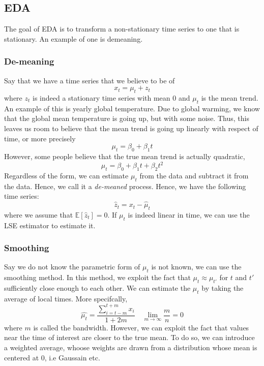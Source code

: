 \documentclass[12pt]{article}
\newcommand{\E}{\mathbb{E}}
\begin{document}
\subsection{EDA}
The goal of EDA is to transform a non-stationary time series to one that is stationary. An example of one is demeaning. 
\subsubsection{De-meaning}
Say that we have a time series that we believe to be of 
\[
	x_t = \mu_t + z_t 
\]
where $z_t$ is indeed a stationary time series with mean 0 and $\mu_t$ is the mean trend. An example of this is yearly global temperature. Due to global warming, we know that the global mean temperature is going up, but with some noise. Thus, this leaves us room to believe that the mean trend is going up linearly with respect of time, or more precisely 
\[
	\mu_t = \beta_0 + \beta_1t 
\]
However, some people believe that the true mean trend is actually quadratic, 
\[
	\mu_t = \beta_0 + \beta_1 t + \beta_2 t^2 
\]
Regardless of the form, we can estimate $\mu_t$ from the data and subtract it from the data. Hence, we call it a \emph{de-meaned} process. Hence, we have the following time series:
\[
	\hat{z}_t = x_t - \hat{\mu}_t 
\]
where we assume that $\E[\hat{z}_t] = 0$. If $\mu_t$ is indeed linear in time, we can use the LSE estimator to estimate it. 
\subsubsection{Smoothing}
Say we do not know the parametric form of $\mu_t$ is not known, we can use the smoothing method. In this method, we exploit the fact that $\mu_t \approx \mu_{t'}$ for $t$ and $t'$ sufficiently close enough to each other. We can estimate the $\mu_t$ by taking the average of local times. More specifcally, 
\[
	\hat{\mu_t} = \frac{\sum_{i = t-m}^{t+m} x_i}{1+2m} \quad \lim_{m \to \infty} \frac{m}{n} = 0
\]
where $m$ is called the bandwidth. However, we can exploit the fact that values near the time of interest are closer to the true mean. To do so, we can introduce a weighted average, whoose weights are drawn from a distribution whose mean is centered at 0, i.e Gaussain etc. 
\end{document}
